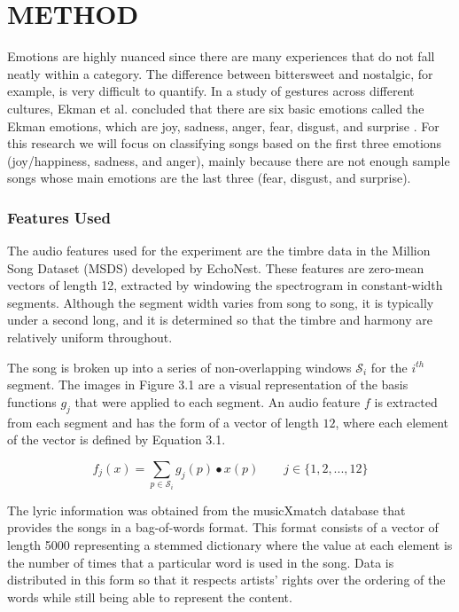 \renewcommand{\chaptername}{}

\chapter{METHOD}

Emotions are highly nuanced since there are many experiences that do not fall neatly within a category. 
The difference between bittersweet and nostalgic, for example, is very difficult to quantify. In a study of gestures across different 
cultures, Ekman et al. concluded that there are six basic emotions called the Ekman emotions, which are 
 joy, sadness, anger, fear, disgust, and surprise \cite{ekman1987universals}.  For this research we will focus on 
classifying songs based on the first three emotions (joy/happiness, sadness, and anger), mainly because there are not enough sample songs whose main
emotions are the last three (fear, disgust, and surprise).

\subsection*{Features Used}

The audio features used for the experiment are the timbre data in the Million Song Dataset (MSDS) developed by EchoNest.
These features are zero-mean vectors of length 12,  extracted by windowing the spectrogram in constant-width segments. 
Although the segment width varies from song to song, it is typically under a second long, and it is determined
so that the timbre and harmony are relatively uniform throughout.  

The song is broken up into a series of non-overlapping windows $\mathcal{S}_i$ for the $i^{th}$ segment. 
The images in Figure 3.1 are a visual representation of the basis functions $g_j$ that were applied to each segment. 
An audio feature $f$ is extracted from each segment and has the form of a vector of length $12$,
 where each element of the vector is defined by Equation 3.1.
 
\begin{equation}
f_j (x) = \sum_{p \in \mathcal{S}_i} g_j(p) \bullet x(p) \qquad j \in \{1, 2, ..., 12\}
\end{equation}

The lyric information was obtained from the musicXmatch database \cite{musicXmatchDataset} 
that provides the songs in a bag-of-words format. This format consists  of a vector of length 5000 representing 
a stemmed dictionary where the value at each element is the number of times that a particular word
is used in the song. Data is distributed in this form so that it respects artists' 
rights over the ordering of the words while still being able to represent the content. 

